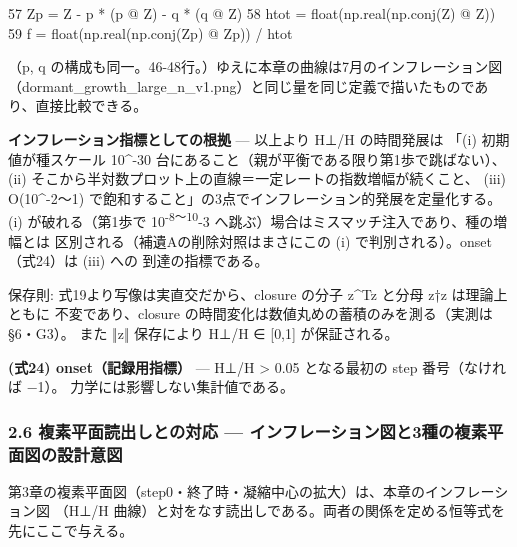 \documentclass[
  a4paper,
]{ltjsarticle}
\newenvironment{Shaded}{}{}
\newcommand{\BuiltInTok}[1]{\textcolor[rgb]{0.00,0.50,0.00}{#1}}
\newcommand{\DecValTok}[1]{\textcolor[rgb]{0.25,0.63,0.44}{#1}}
\newcommand{\NormalTok}[1]{#1}
\newcommand{\OperatorTok}[1]{\textcolor[rgb]{0.40,0.40,0.40}{#1}}
\begin{document}
\begin{Shaded}
\begin{Highlighting}[]
    \DecValTok{57}\NormalTok{          Zp }\OperatorTok{=}\NormalTok{ Z }\OperatorTok{{-}}\NormalTok{ p }\OperatorTok{*}\NormalTok{ (p }\OperatorTok{@}\NormalTok{ Z) }\OperatorTok{{-}}\NormalTok{ q }\OperatorTok{*}\NormalTok{ (q }\OperatorTok{@}\NormalTok{ Z)}
    \DecValTok{58}\NormalTok{          htot }\OperatorTok{=} \BuiltInTok{float}\NormalTok{(np.real(np.conj(Z) }\OperatorTok{@}\NormalTok{ Z))}
    \DecValTok{59}\NormalTok{          f }\OperatorTok{=} \BuiltInTok{float}\NormalTok{(np.real(np.conj(Zp) }\OperatorTok{@}\NormalTok{ Zp)) }\OperatorTok{/}\NormalTok{ htot}
\end{Highlighting}
\end{Shaded}

（p, q
の構成も同一。46-48行。）ゆえに本章の曲線は7月のインフレーション図
（dormant\_growth\_large\_n\_v1.png）と同じ量を同じ定義で描いたものであり、直接比較できる。

\textbf{インフレーション指標としての根拠} --- 以上より H⊥/H の時間発展は
「(i) 初期値が種スケール 10\^{}-30
台にあること（親が平衡である限り第1歩で跳ばない）、 (ii)
そこから半対数プロット上の直線＝一定レートの指数増幅が続くこと、 (iii)
O(10\^{}-2〜1)
で飽和すること」の3点でインフレーション的発展を定量化する。 (i)
が破れる（第1歩で 10\textsuperscript{-8〜10}-3
へ跳ぶ）場合はミスマッチ注入であり、種の増幅とは
区別される（補遺Aの削除対照はまさにこの (i)
で判別される）。onset（式24）は (iii) への 到達の指標である。

保存則: 式19より写像は実直交だから、closure の分子
\textbar z\^{}Tz\textbar{} と分母 z†z は理論上ともに 不変であり、closure
の時間変化は数値丸めの蓄積のみを測る（実測は §6・G3）。 また ‖z‖
保存により H⊥/H ∈ {[}0,1{]} が保証される。

\textbf{(式24) onset（記録用指標）} --- H⊥/H \textgreater{} 0.05
となる最初の step 番号（なければ −1）。 力学には影響しない集計値である。

\subsubsection{2.6 複素平面読出しとの対応 ---
インフレーション図と3種の複素平面図の設計意図}\label{ux8907ux7d20ux5e73ux9762ux8aadux51faux3057ux3068ux306eux5bfeux5fdc-ux30a4ux30f3ux30d5ux30ecux30fcux30b7ux30e7ux30f3ux56f3ux30683ux7a2eux306eux8907ux7d20ux5e73ux9762ux56f3ux306eux8a2dux8a08ux610fux56f3}

第3章の複素平面図（step0・終了時・凝縮中心の拡大）は、本章のインフレーション図
（H⊥/H
曲線）と対をなす読出しである。両者の関係を定める恒等式を先にここで与える。
\end{document}
